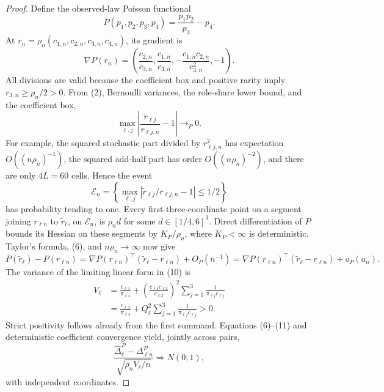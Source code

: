 \documentclass{article}
\begin{document}
\begin{proof}
Define the observed-law Poisson functional
\[
 P(p_1,p_2,p_3,p_4)=\frac{p_1p_2}{p_3}-p_4.
\]
At \(r_n=\rho_n(c_{1,n},c_{2,n},c_{3,n},c_{4,n})\), its gradient is
\[
 \nabla P(r_n)=\left(
 \frac{c_{2,n}}{c_{3,n}},
 \frac{c_{1,n}}{c_{3,n}},
 -\frac{c_{1,n}c_{2,n}}{c_{3,n}^2},-1\right).
\tag{7}
\]
All divisions are valid because the coefficient box and positive rarity imply \(r_{3,n}\geq\rho_n/2>0\). From (2), Bernoulli variances, the role-share lower bound, and the coefficient box,
\[
 \max_{\ell,j}\left|\frac{\widetilde r_{\ell j}}{r_{\ell j,n}}-1\right|
 \longrightarrow_P0.
\tag{8}
\]
For example, the squared stochastic part divided by \(r_{\ell j,n}^2\) has expectation \(O((n\rho_n)^{-1})\), the squared add-half part has order \(O((n\rho_n)^{-2})\), and there are only \(4L=60\) cells. Hence the event
\[
 \mathcal E_n=\left\{
 \max_{\ell,j}|\widetilde r_{\ell j}/r_{\ell j,n}-1|\leq1/2
 \right\}
\tag{9}
\]
has probability tending to one. Every first-three-coordinate point on a segment joining \(r_{\ell n}\) to \(\widetilde r_\ell\), on \(\mathcal E_n\), is \(\rho_nd\) for some \(d\in[1/4,6]^3\). Direct differentiation of \(P\) bounds its Hessian on these segments by \(K_P/\rho_n\), where \(K_P<\infty\) is deterministic. Taylor's formula, (6), and \(n\rho_n\to\infty\) now give
\[
 P(\widetilde r_\ell)-P(r_{\ell n})
 =\nabla P(r_{\ell n})^{\!\top}(\widetilde r_\ell-r_{\ell n})
 +O_P(n^{-1})
 =\nabla P(r_{\ell n})^{\!\top}(\widetilde r_\ell-r_{\ell n})+o_P(a_n).
\tag{10}
\]
The variance of the limiting linear form in (10) is
\[
 \begin{aligned}
 V_\ell
 &=\frac{c_{\ell4}}{\pi_{\ell4}}
 +\left(\frac{c_{\ell1}c_{\ell2}}{c_{\ell3}}\right)^2
 \sum_{j=1}^3\frac1{\pi_{\ell j}c_{\ell j}}\\
 &=\frac{c_{\ell4}}{\pi_{\ell4}}+Q_\ell^2
 \sum_{j=1}^3\frac1{\pi_{\ell j}c_{\ell j}}>0.
 \end{aligned}
\tag{11}
\]
Strict positivity follows already from the first summand. Equations (6)--(11) and deterministic coefficient convergence yield, jointly across pairs,
\[
 \frac{\widehat\Delta^P_\ell-\Delta^P_{\ell n}}
 {\sqrt{\rho_nV_\ell/n}}\Rightarrow N(0,1),
\tag{12}
\]
with independent coordinates.


\end{proof}
\end{document}
